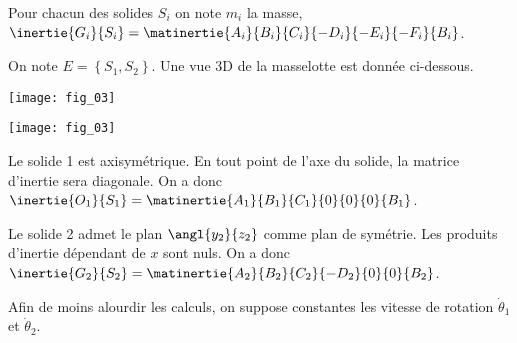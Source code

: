 Pour chacun des solides $S_i$ on note $m_i$ la masse, $\inertie{G_i}{S_i}=\matinertie{A_i}{B_i}{C_i}{-D_i}{-E_i}{-F_i}{B_i}$.

On note $E=\left\{ S_1,S_2\right\}$. 
Une vue 3D de la masselotte est donnée ci-dessous. 

\ifprof
\begin{center}
\texttt{[image: fig\_03]}
\end{center}
\else
\begin{center}
\texttt{[image: fig\_03]}
\end{center}
\fi

\ifprof
\begin{corrige}
Le solide 1 est axisymétrique. En tout point de l'axe du solide, la matrice d'inertie sera diagonale. On a donc $\inertie{O_1}{S_1}=\matinertie{A_1}{B_1}{C_1}{0}{0}{0}{B_1}$.

Le solide 2 admet le plan $\angl{y_2}{z_2}$ comme plan de symétrie. Les produits d'inertie dépendant de $x$ sont nuls. On a donc $\inertie{G_2}{S_2}=\matinertie{A_2}{B_2}{C_2}{-D_2}{0}{0}{B_2}$.

\end{corrige}
\else
\fi


Afin de moins alourdir les calculs, on suppose constantes les vitesse de rotation $\dot{\theta}_1$ et $\dot{\theta}_2$.



